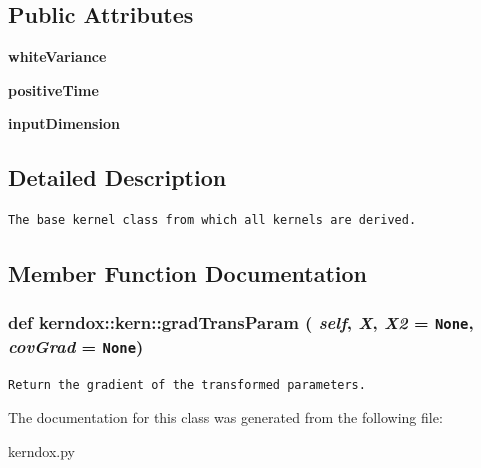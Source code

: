 \subsection*{Public Attributes}
\begin{CompactItemize}
\item 
\hypertarget{classkerndox_1_1kern_5f8ec7b4480f8141836641031c962431}{
\textbf{whiteVariance}}
\label{classkerndox_1_1kern_5f8ec7b4480f8141836641031c962431}

\item 
\hypertarget{classkerndox_1_1kern_7977972fdb27885ea61466bc1eeb8d71}{
\textbf{positiveTime}}
\label{classkerndox_1_1kern_7977972fdb27885ea61466bc1eeb8d71}

\item 
\hypertarget{classkerndox_1_1kern_a01106d427eac3a5b4b2a11bc2ef4aef}{
\textbf{inputDimension}}
\label{classkerndox_1_1kern_a01106d427eac3a5b4b2a11bc2ef4aef}

\end{CompactItemize}


\subsection{Detailed Description}


\footnotesize\begin{verbatim}The base kernel class from which all kernels are derived.\end{verbatim}
\normalsize
 

\subsection{Member Function Documentation}
\hypertarget{classkerndox_1_1kern_b35888c8c1af6431451652b44fd82002}{
\subsubsection[{gradTransParam}]{\setlength{\rightskip}{0pt plus 5cm}def kerndox::kern::gradTransParam ( {\em self}, \/   {\em X}, \/   {\em X2} = {\tt None}, \/   {\em covGrad} = {\tt None})}}
\label{classkerndox_1_1kern_b35888c8c1af6431451652b44fd82002}




\footnotesize\begin{verbatim}Return the gradient of the transformed parameters.\end{verbatim}
\normalsize
 

The documentation for this class was generated from the following file:\begin{CompactItemize}
\item 
kerndox.py\end{CompactItemize}
